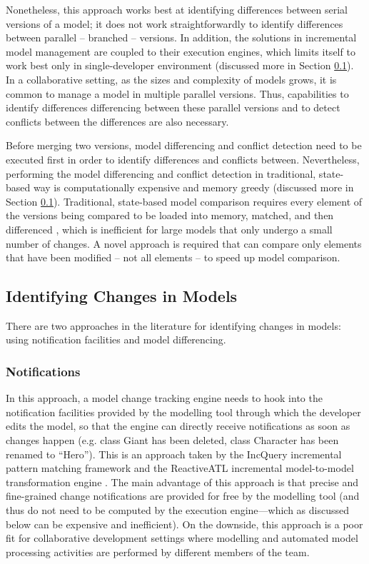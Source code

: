 Nonetheless, this approach works best at identifying differences between serial versions of a model; it does not work straightforwardly to identify differences between parallel -- branched -- versions. In addition, the solutions in incremental model management are coupled to their execution engines, which limits itself to work best only in single-developer environment (discussed more in Section \ref{sec:identifying_changes_in models}). In a collaborative setting, as the sizes and complexity of models grows, it is common to manage a model in multiple parallel versions. Thus, capabilities to identify differences differencing between these parallel versions and to detect conflicts between the differences are also necessary.

Before merging two versions, model differencing and conflict detection need to be executed first in order to identify differences and conflicts between. Nevertheless, performing the model differencing and conflict detection in traditional, state-based way is computationally expensive and memory greedy (discussed more in Section \ref{sec:identifying_changes_in models}). Traditional, state-based model comparison requires every element of the versions being compared to be loaded into memory, matched, and then differenced \cite{emfcompare2018developer}, which is inefficient for large models that only undergo a small number of changes. A novel approach is required that can compare only elements that have been modified -- not all elements -- to speed up model comparison.

\subsection{Identifying Changes in Models}
\label{sec:identifying_changes_in models}
There are two approaches in the literature for identifying changes in models: using notification facilities and model differencing.

\subsubsection{Notifications}
\label{sec:notifications}
In this approach, a model change tracking 
engine needs to hook into the notification facilities 
provided by the modelling tool through which the developer edits the model, 
so that the engine can directly receive notifications as soon as 
changes happen (e.g. class \textsf{Giant} has been deleted, class \textsf{Character} has been renamed to ``Hero''). 
This is an approach taken by the IncQuery incremental pattern matching 
framework \cite{DBLP:conf/ecmdafa/RathHV12} and the ReactiveATL incremental model-to-model 
transformation engine \cite{DBLP:conf/ecmdafa/OgunyomiRK15}. The main advantage of this 
approach is that precise and fine-grained change notifications are provided 
for free by the modelling tool (and thus do not need to be computed by the 
execution engine---which as discussed below can be expensive and inefficient). 
On the downside, this approach is a poor fit for collaborative development 
settings where modelling and automated model processing activities are 
performed by different members of the team.

